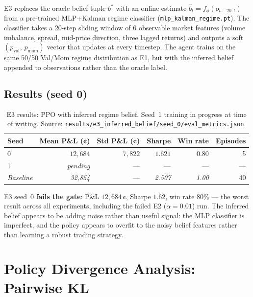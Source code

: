\documentclass[11pt]{article}
\begin{document}
E3 replaces the oracle belief tuple $b^*$ with an online estimate
$\hat{b}_t = f_\phi(o_{t-20:t})$ from a pre-trained MLP+Kalman regime
classifier (\texttt{mlp\_kalman\_regime.pt}).
The classifier takes a 20-step sliding window of 6 observable market
features (volume imbalance, spread, mid-price direction, three lagged
returns) and outputs a soft $(p_\text{val},\, p_\text{mom})$ vector that
updates at every timestep.
The agent trains on the same 50/50 Val/Mom regime distribution as E1,
but with the inferred belief appended to observations rather than the
oracle label.

\subsection{Results (seed 0)}

\begin{table}[H]
\centering
\begin{tabular}{lrrrrr}
\toprule
\textbf{Seed} &
\textbf{Mean P\&L (¢)} &
\textbf{Std P\&L (¢)} &
\textbf{Sharpe} &
\textbf{Win rate} &
\textbf{Episodes} \\
\midrule
0 & $12{,}684$ & $\phantom{0}7{,}822$ & $1.621$ & $0.80$ & 5 \\
1 & \emph{pending} & --- & --- & --- & --- \\
\midrule
\textit{Baseline} & \textit{32,854} & --- & \textit{2.507} & \textit{1.00} & 40 \\
\bottomrule
\end{tabular}
\caption{E3 results: PPO with inferred regime belief.
         Seed~1 training in progress at time of writing.
         Source: \texttt{results/e3\_inferred\_belief/seed\_0/eval\_metrics.json}.}
\label{tab:e3}
\end{table}

E3 seed~0 \textbf{fails the gate}: P\&L $12{,}684$\,¢, Sharpe $1.62$, win
rate $80\%$ --- the worst result across all experiments, including the
failed E2 ($\alpha=0.01$) run.
The inferred belief appears to be adding noise rather than useful signal:
the MLP classifier is imperfect, and the policy appears to overfit to the
noisy belief features rather than learning a robust trading strategy.

\section{Policy Divergence Analysis: Pairwise KL}
\end{document}
